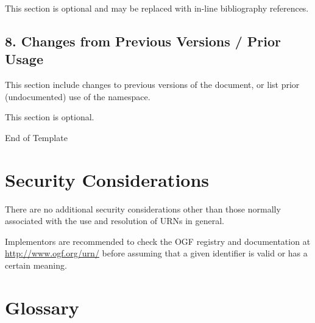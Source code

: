 \documentclass[12pt]{article}  %
\begin{document}
This section is optional and may be replaced with in-line bibliography references.

\subsection*{8. Changes from Previous Versions / Prior Usage}

This section \SHOULD{} include changes to previous versions of the document, 
or list prior (undocumented) use of the namespace.

This section is optional.

\hrulefill\hspace{1ex} \textsf{End of Template} \hspace{1ex}\hrulefill

\section{Security Considerations}

There are no additional security considerations other than those
normally associated with the use and resolution of URNs in general.

Implementors are recommended to check the OGF registry and documentation 
at \url{http://www.ogf.org/urn/} before assuming that a given identifier 
is valid or has a certain meaning.

\section{Glossary}
\end{document}
